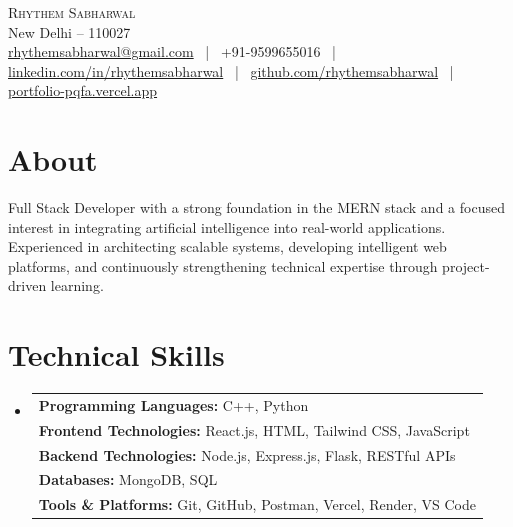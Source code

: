 \documentclass[letterpaper,8.7pt]{article}
\newcommand{\resumeSubHeadingListStart}{\begin{itemize}[leftmargin=0.1in, label={}]}
\newcommand{\resumeSubHeadingListEnd}{\end{itemize}}
\newcommand{\skillCategory}[2]{
  \textbf{#1:} \footnotesize{#2}
}
\begin{document}
\setlength{\parskip}{0pt}
\setlength{\itemsep}{-2pt}
\setlength{\parsep}{0pt}
\linespread{0.97}

\begin{center}
  {\Huge \scshape Rhythem Sabharwal} \\ \vspace{1pt}
  New Delhi – 110027 \\ \vspace{1pt}
  \href{mailto:rhythemsabharwal@gmail.com}{rhythemsabharwal@gmail.com} ~|~ +91-9599655016 ~|~ 
  \href{www.linkedin.com/in/rhythem-sabharwal-a9027529b}{linkedin.com/in/rhythemsabharwal} ~|~ 
  \href{https://github.com/rhythemsabharwal}{github.com/rhythemsabharwal} ~|~ 
  \href{https://portfolio-pqfa.vercel.app/}{portfolio-pqfa.vercel.app}
\end{center}

\vspace{-12pt}
\section*{About}
Full Stack Developer with a strong foundation in the MERN stack and a focused interest in integrating artificial intelligence into real-world applications. Experienced in architecting scalable systems, developing intelligent web platforms, and continuously strengthening technical expertise through project-driven learning.

\section{Technical Skills}
\resumeSubHeadingListStart
\item{
    \begin{tabular*}{0.97\textwidth}{l}
        \skillCategory{Programming Languages}{C++, Python} \\[0pt]
        \skillCategory{Frontend Technologies}{React.js, HTML, Tailwind CSS, JavaScript} \\[0pt]
        \skillCategory{Backend Technologies}{Node.js, Express.js, Flask, RESTful APIs} \\[0pt]
        \skillCategory{Databases}{MongoDB, SQL} \\[0pt]
        \skillCategory{Tools \& Platforms}{Git, GitHub, Postman, Vercel, Render, VS Code} \\[0pt]
    \end{tabular*}
}
\resumeSubHeadingListEnd
\end{document}
